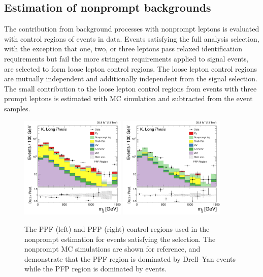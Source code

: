 \subsection{Estimation of nonprompt backgrounds}
\label{sec:nonpromptbackgrounds}

The contribution from background processes with nonprompt leptons is
evaluated with control regions of events in data.
Events satisfying the full analysis selection,
with the exception that one, two, or three leptons pass relaxed identification
requirements but fail the more stringent requirements applied to signal events,
are selected to form loose lepton control regions. The loose lepton control regions are
mutually independent and additionally independent from the signal selection.
The small contribution to the loose lepton control regions from events with three prompt leptons
is estimated with MC simulation and 
subtracted from the event samples.

\begin{figure}[htbp]
  \centering
   \includegraphics[width=0.45\textwidth]{figures/AnalysisProcedure/mjj_PPF.pdf}
   \includegraphics[width=0.45\textwidth]{figures/AnalysisProcedure/mjj_PFP.pdf}
  \caption[The PPF (left) and PFP (right) control regions used in the nonprompt estimation]{
    The PPF (left) and PFP (right) control regions used in the nonprompt estimation
    for events satisfying the \WZjj selection.
    The nonprompt MC simulations are shown for reference, and demonstrate that the
    PPF region is dominated by Drell--Yan events while the PFP region
    is dominated by {\ttbar} events.
        }
 \label{fig:nonpromptBackgroundCRs}
\end{figure}

